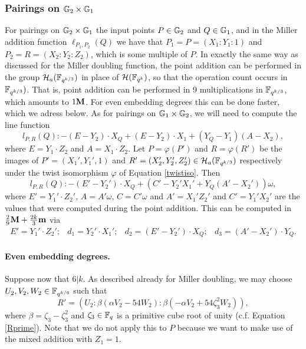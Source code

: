 \subsubsection{Pairings on $\mathbb{G}_{2} \times \mathbb{G}_{1}$}

For pairings on $\mathbb{G}_{2} \times \mathbb{G}_{1}$ the input points $P \in \mathbb{G}_{2}$ and $Q \in \mathbb{G}_{1}$, and in the Miller addition function $\ell_{P_1,P_2}(Q)$ we have that
$P_1 = P = (X_1:Y_1:1)$ and $P_2 = R = (X_2:Y_2:Z_2)$, which is some multiple of $P$. 
In exactly the same way as discussed for the Miller doubling function,
the point addition can be performed in the group $\mathcal{H}_a(\mathbb{F}_{q^{k/3}})$
in place of $\mathcal{H}(\mathbb{F}_{q^k})$, so that the operation count occurs in
$\mathbb{F}_{q^{k/3}})$. That is, point addition can be performed in 9 multiplications in 
$\mathbb{F}_{q^{k/3}}$, which amounts to $1\textbf{M}$. 
For even embedding degrees this can be done faster, which we adress below.
As for pairings on $\mathbb{G}_{1} \times \mathbb{G}_{2}$, we will need to compute the line function
$$l_{P,R}(Q): - (E - Y_2) \cdot X_{Q} + (E - Y_2) \cdot X_1 + (Y_{Q}-Y_1)(A-X_2), $$
where $E = Y_1 \cdot Z_2$ and $A = X_1 \cdot Z_2$.
Let $P = \varphi(P')$ and $R = \varphi(R')$ be the images of 
$P' = (X_1',Y_1',1)$ and $R' = (X_2',Y_2',Z_2') \in \mathcal{H}_a(\mathbb{F}_{q^{k/3}})$ respectively
under the twist isomorphism $\varphi$ of Equation \eqref{twistiso}.
Then 
$$l_{P,R}(Q): - (E' - Y_2') \cdot X_{Q} + (C'-Y_2'X_1' + Y_Q(A'-X_2'))\omega, $$
where $E' = Y_1' \cdot Z_2'$, $A = A'\omega$, $C = C'\omega$ and 
$A' = X_1'Z_2'$ and $C' = Y_1'X_2'$ are the values that were computed during the point addition.
This can be computed in 
$\frac{2}{9}\textbf{M} + \frac{2k}{3}\textbf{m}$
via
\[\begin{array}{cccc}
E' = Y_1' \cdot Z_2'; &
d_1 = Y_2' \cdot X_1'; &
d_2 = (E' - Y_2') \cdot X_Q; &
d_3 = (A' - X_2')\cdot Y_Q.
\end{array}\]

\paragraph*{Even embedding degrees.}

Suppose now that $6 | k$.
As described already for Miller doubling, we may choose $U_2,V_2,W_2 \in \mathbb{F}_{q^{k/6}}$ such that
\[ R' = (U_2:\beta(\alpha V_2 - 54W_2) : \beta(-\alpha V_2 + 54\zeta_3^2 W_2)),
\]
where $\beta = \zeta_3-\zeta_3^2$ and 
$\zeta_3 \in \mathbb{F}_{q}$ is a primitive cube root of unity (c.f. Equation \eqref{Rprime}). 
Note that we do not apply this to $P$ because we want to make use of the mixed addition with $Z_1 = 1$.

